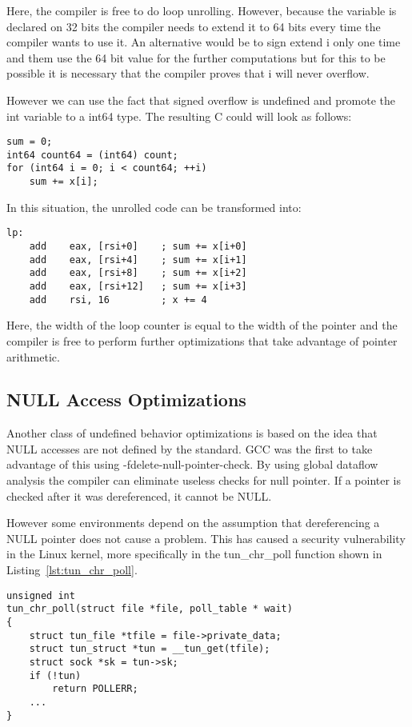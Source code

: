 Here, the compiler is free to do loop unrolling. However, because the
variable is declared on 32 bits the compiler needs to extend it to 64
bits every time the compiler wants to use it. An alternative would be to
sign extend i only one time and them use the 64 bit value for the
further computations but for this to be possible it is necessary that
the compiler proves that i will never overflow.

However we can use the fact that signed overflow is undefined and
promote the int variable to a int64 type. The resulting C could will
look as follows:
\begin{lstlisting}[style=Cstyle, caption={}, label={}]
sum = 0;
int64 count64 = (int64) count;
for (int64 i = 0; i < count64; ++i)
	sum += x[i];
\end{lstlisting}

In this situation, the unrolled code can be transformed into:
\begin{lstlisting}[style=Cstyle, caption={}, label={}]
  lp:
    add    eax, [rsi+0]    ; sum += x[i+0]
    add    eax, [rsi+4]    ; sum += x[i+1]
    add    eax, [rsi+8]    ; sum += x[i+2]
    add    eax, [rsi+12]   ; sum += x[i+3]
    add    rsi, 16         ; x += 4
\end{lstlisting}

Here, the width of the loop counter is equal to the width of the pointer
and the compiler is free to perform further optimizations that take
advantage of pointer arithmetic.

\subsection{NULL Access Optimizations}
Another class of undefined behavior optimizations is based on the idea
that NULL accesses are not defined by the standard. GCC was the first to
take advantage of this using -fdelete-null-pointer-check. By using
global dataflow analysis the compiler can eliminate useless checks for
null pointer. If a pointer is checked after it was dereferenced, it
cannot be NULL.

However some environments depend on the assumption that dereferencing a
NULL pointer does not cause a problem. This has caused a security
vulnerability in the Linux kernel, more specifically in the tun_chr_poll
function shown in Listing~\ref{lst:tun_chr_poll}.
\begin{lstlisting}[style=Cstyle, caption={tun_chr_poll in
drivers/net/tun.c of the Linux kernel}, label={lst:tun_chr_poll}]
unsigned int
tun_chr_poll(struct file *file, poll_table * wait)
{
	struct tun_file *tfile = file->private_data;
	struct tun_struct *tun = __tun_get(tfile);
	struct sock *sk = tun->sk;
	if (!tun)
		return POLLERR;
	...
}
\end{lstlisting}

